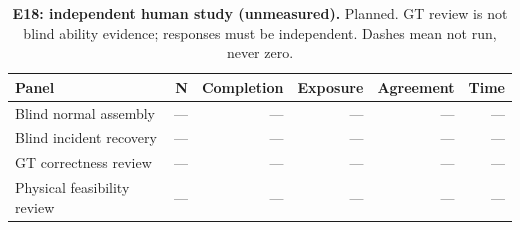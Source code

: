 \begin{table}[!ht]
\centering\small
\caption{\textbf{E18: independent human study (unmeasured).} Planned. GT review is not blind ability evidence; responses must be independent. Dashes mean not run, never zero.}
\begin{tabularx}{\textwidth}{@{}Xrrrrr@{}}\toprule
Panel & N & Completion & Exposure & Agreement & Time\\\midrule
Blind normal assembly & --- & --- & --- & --- & ---\\
Blind incident recovery & --- & --- & --- & --- & ---\\
GT correctness review & --- & --- & --- & --- & ---\\
Physical feasibility review & --- & --- & --- & --- & ---\\
\bottomrule
\end{tabularx}
\end{table}
